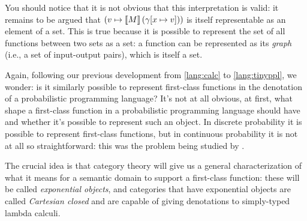 You should notice that it is not obvious that this interpretation is valid: 
it remains to be argued that $(v \mapsto \left\llbracket M\right\rrbracket(\gamma[x \mapsto v]))$
is itself representable as an element of a set. 
This is true because it is possible to represent the set of all functions 
between two sets as a set: a function can be represented as its \emph{graph} (i.e., 
a set of input-output pairs), which is itself a set.

Again, following our previous development from \ref{lang:calc} to \ref{lang:tinyppl},
we wonder: is it similarly possible to represent first-class functions in 
the denotation of a probabilistic programming language? It's not at all obvious, 
at first, what shape a first-class function in a probabilistic programming 
language should have and whether it's possible to represent such an object.
In discrete probability it is possible to represent first-class functions, 
but in continuous probability it is not at all so straightforward: this was the 
problem being studied by \citep{heunen2017convenient}.

The crucial idea is that category theory will give us a general characterization 
of what it means for a semantic domain to support a first-class function: 
these will be called \emph{exponential objects}, and categories that have 
exponential objects are called \emph{Cartesian closed}
and are capable of giving denotations to simply-typed lambda calculi.




